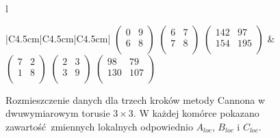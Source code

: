 \begin{przyklad}
\begin{figure}[H]
\begin{tabular}{l}
\begin{tabular}{|C{4.5cm}|C{4.5cm}|C{4.5cm}|}
\(\begin{pmatrix}
        0 & 9 \\
        6 & 8 \\    
\end{pmatrix}\)
\(\begin{pmatrix}
        6 & 7 \\
        7 & 8 \\    
\end{pmatrix}\)
\(\begin{pmatrix}
        142 & 97 \\
        154 & 195 \\    
\end{pmatrix}\) &
\(\begin{pmatrix}
        7 & 2 \\
        1 & 8 \\    
\end{pmatrix}\)
\(\begin{pmatrix}
        2 & 3 \\
        3 & 9 \\    
\end{pmatrix}\)
\(\begin{pmatrix}
        98 & 79 \\
        130 & 107 \\    
\end{pmatrix}\) \\
\hline
\end{tabular} 
\end{tabular}
\caption{Rozmieszczenie danych dla trzech kroków metody Cannona w dwuwymiarowym torusie \(3\times 3\). W każdej komórce pokazano zawartość zmiennych lokalnych odpowiednio \(A_{loc}\), \(B_{loc}\) i \(C_{loc}\).}
\label{fig:cannon_example1}
\end{figure}

\end{przyklad}
